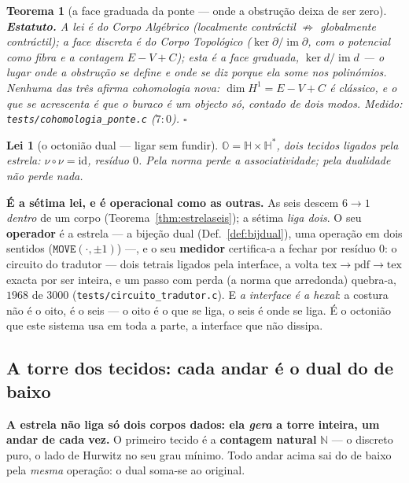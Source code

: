 \documentclass[11pt,a4paper]{article}
\newcommand{\code}[1]{\texttt{\small #1}}
\newtheorem{teorema}{Teorema}
\newtheorem{lei}{Lei}
\begin{document}
\begin{teorema}[a face graduada da ponte --- onde a obstrução deixa de ser
zero]
\textbf{Estatuto.} A lei é do \emph{Corpo Algébrico} (localmente
contráctil $\not\Rightarrow$ globalmente contráctil); a face discreta é
do \emph{Corpo Topológico} ($\ker\partial/\operatorname{im}\partial$,
com o potencial como fibra e a contagem $E-V+C$); esta é a face
graduada, $\ker d/\operatorname{im}d$ --- o lugar onde a obstrução se define
e onde se diz \emph{porque} ela some nos polinómios. Nenhuma das três
afirma cohomologia nova: $\dim H^{1}=E-V+C$ é clássico, e o que se
acrescenta é que o buraco é \emph{um objecto só}, contado de dois modos.
\emph{Medido:} \code{tests/cohomologia\_ponte.c} ($7{:}0$).
$\square$
\end{teorema}

\setcounter{lei}{6}
\begin{lei}[o octonião dual --- ligar sem fundir]\label{lei:octoniao}
$\mathbb{O}=\mathbb{H}\times\mathbb{H}^{*}$, dois tecidos ligados pela estrela: $\nu\circ\nu=\mathrm{id}$,
resíduo $0$. Pela norma perde a associatividade; pela dualidade não perde nada.
\end{lei}

\noindent \textbf{É a sétima lei, e é operacional como as outras.} As seis descem $6\to1$ \emph{dentro} de
um corpo (Teorema~\ref{thm:estrelaseis}); a sétima \emph{liga dois}. O seu \textbf{operador} é a estrela
--- a bijeção dual (Def.~\ref{def:bijdual}), uma operação em dois sentidos ($\texttt{MOVE}(\cdot,\pm1)$)
---, e o seu \textbf{medidor} certifica-a a fechar por resíduo $0$: o circuito do tradutor --- dois
tetrais ligados pela interface, a volta $\text{tex}\to\text{pdf}\to\text{tex}$ exacta por ser inteira, e um
passo com perda (a norma que arredonda) quebra-a, $1968$ de $3000$ (\code{tests/circuito\_tradutor.c}). E
\emph{a interface é a hexal}: a costura não é o oito, é o seis --- o oito é o que se liga, o seis é onde
se liga. É o octonião que este sistema usa em toda a parte, a interface que não dissipa.

\subsection*{A torre dos tecidos: cada andar é o dual do de baixo}\label{sub:tecidos}

\textbf{A estrela não liga só dois corpos dados: ela \emph{gera} a torre inteira, um andar de cada
vez.} O primeiro tecido é a \textbf{contagem natural} $\mathbb{N}$ --- o discreto puro, o lado de Hurwitz no
seu grau mínimo. Todo andar acima sai do de baixo pela \emph{mesma} operação: o dual soma-se ao
original.
\end{document}

